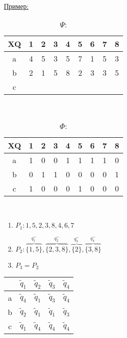 \documentclass[a5paper,10pt]{article}
\begin{document}
			\paragraph{}
				\underline{Пример:} \\
				\begin{table}[h]
					\centering
					\caption{$\Psi$:}
					\begin{tabular}{*{9}{c}}
						XQ & 1 & 2 & 3 & 4 & 5 & 6 & 7 & 8 \\
						\hline
						a & 4 & 5 & 3 & 5 & 7 & 1 & 5 & 3 \\
						b & 2 & 1 & 5 & 8 & 2 & 3 & 3 & 5 \\
						c & & & & & & & & \\
					\end{tabular} \\
				\end{table}

				\begin{table}[h]
					\centering
					\caption{$\Phi$:}
					\begin{tabular}{*{9}{c}}
						XQ & 1 & 2 & 3 & 4 & 5 & 6 & 7 & 8 \\
						\hline
						a & 1 & 0 & 0 & 1 & 1 & 1 & 1 & 0 \\
						b & 0 & 1 & 1 & 0 & 0 & 0 & 0 & 1 \\
						c & 1 & 0 & 0 & 0 & 1 & 0 & 0 & 0 \\
					\end{tabular} \\
				\end{table}

				\begin{enumerate}
					\item $P_1: {1,5}, {2,3,8}, {4,6,7}$
					\item $P_2: \overbrace{\{1,5\}}^{q^{\sim}_1}, \overbrace{\{2,3,8\}}^{q^{\sim}_2}, \overbrace{\{2\}}^{q^{\sim}_3}, \overbrace{\{3,8\}}^{q^{\sim}_4}$
					\item $P_3=P_2$
				\end{enumerate}

				\begin{table}[h]
					\centering
					\begin{tabular}{*{5}{c}}
						& $\tilde q_1$ & $\tilde q_2$ & $\tilde q_3$ & $\tilde q_4$ \\
						\hline
						a & $\tilde q_4$ & $\tilde q_1$ & $\tilde q_3$ & $\tilde q_4$ \\
						b & $\tilde q_2$ & $\tilde q_1$ & $\tilde q_1$ & $\tilde q_3$ \\
						c & $\tilde q_1$ & $\tilde q_4$ & $\tilde q_4$ & $\tilde q_4$ \\
					\end{tabular}
				\end{table}
\end{document}
